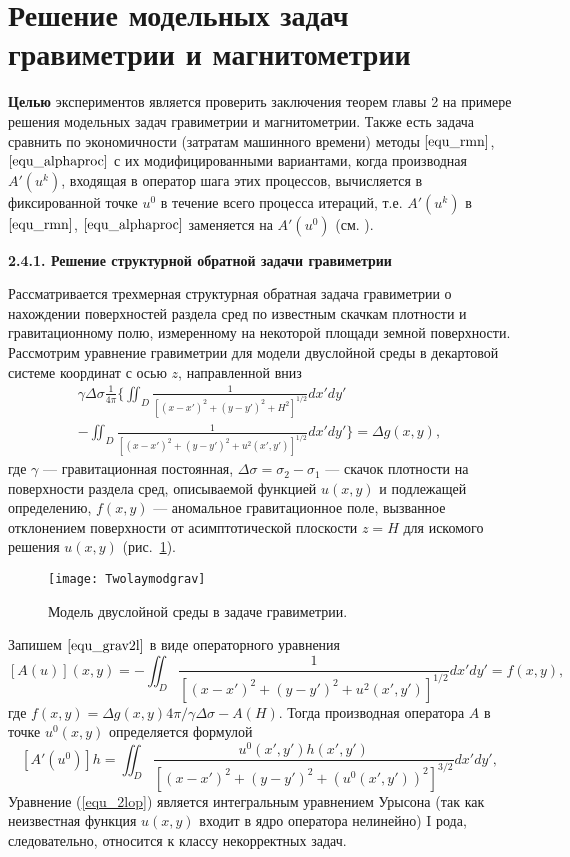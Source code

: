 \newpage
\section{Решение модельных задач гравиметрии и магнитометрии}

{\bfseries Целью} экспериментов является проверить заключения теорем главы 2 на примере решения модельных задач гравиметрии и магнитометрии. Также есть задача сравнить по экономичности (затратам машинного времени) методы $\eqref{equ_rmn}$, $\eqref{equ_alphaproc}$ с их модифицированными вариантами, когда производная $A'(u^k)$, входящая в оператор шага этих процессов, вычисляется в фиксированной точке $u^0$ в течение всего процесса итераций, т.е. $A'(u^k)$ в $\eqref{equ_rmn}$, $\eqref{equ_alphaproc}$ заменяется на $A'(u^0)$ (см. \cite{Vasin2014, Vasin2016}). 

{\bfseries 2.4.1. Решение структурной обратной задачи гравиметрии} 

Рассматривается трехмерная структурная обратная задача гравиметрии о нахождении поверхностей раздела сред по известным скачкам плотности и гравитационному полю, измеренному на некоторой площади земной поверхности.
Рассмотрим уравнение гравиметрии для модели двуслойной среды в декартовой системе координат с осью $z$, направленной вниз 
\begin{equation}\label{equ_grav2l}
\begin{aligned}
\gamma\Delta\sigma\frac{1}{4\pi} \bigg\{ \iint_{D} \frac{1}{[(x-x')^2+(y-y')^2+H^2]^{1/2}}dx'dy' \\
- 
\iint_{D} \frac{1}{[(x-x')^2+(y-y')^2+u^2(x',y')]^{1/2}}dx'dy'\bigg\}=\Delta g(x,y),
\end{aligned} 
\end{equation}
где $\gamma$ --- гравитационная постоянная, $\Delta\sigma=\sigma_2-\sigma_1$ --- скачок плотности на поверхности раздела сред, описываемой функцией $u(x,y)$ и подлежащей определению, $f(x,y)$ --- аномальное гравитационное поле, вызванное отклонением поверхности от асимптотической плоскости $z=H$ для искомого решения $u(x,y)$ (рис.~\ref{fig:twolayergrav}). 
\begin{figure}[H]
	\centering
	\texttt{[image: Twolaymodgrav]}
	\caption{Модель двуслойной среды в задаче гравиметрии.}
	\label{fig:twolayergrav}
	\end{figure}
Запишем $\eqref{equ_grav2l}$ в виде операторного уравнения
\begin{equation}\label{equ_2lop}
	[A(u)](x,y)=-\iint_{D} \frac{1}{[(x-x')^2+(y-y')^2+u^2(x',y')]^{1/2}}dx'dy'=f(x,y),
\end{equation}
где $f(x,y)=\Delta g(x,y) 4\pi/\gamma\Delta\sigma - A(H)$. Тогда производная оператора $A$ в точке $u^0(x,y)$ определяется формулой
$$ [A'(u^0)]h=\iint_{D} \frac{u^0(x',y')h(x',y')}{[(x-x')^2+(y-y')^2+(u^0(x',y'))^2]^{3/2}}dx'dy', $$
Уравнение (\ref{equ_2lop}) является интегральным уравнением Урысона (так как неизвестная функция $u(x,y)$ входит в ядро оператора нелинейно) I рода, следовательно, относится к классу некорректных задач.
	
